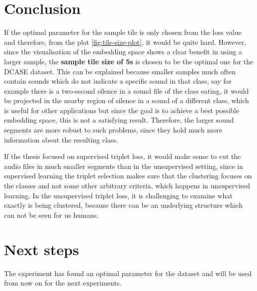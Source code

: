 \documentclass[twocolumn]{article}
\begin{document}
\section{Conclusion}
If the optimal parameter for the sample tile is only chosen from the loss value and therefore, from the plot \ref{fig:tile-size-plot}, it would be quite hard. However, since the visualisation of the embedding space shows a clear benefit in using a larger sample, the \textbf{sample tile size of 5s} is chosen to be the optimal one for the DCASE dataset. This can be explained because smaller samples much often contain sounds which do not indicate a specific sound in that class, say for example there is a two-second silence in a sound file of the class eating, it would be projected in the nearby region of silence in a sound of a different class, which is useful for other applications but since the goal is to achieve a best possible embedding space, this is not a satisfying result. Therefore, the larger sound segments are more robust to such problems, since they hold much more information about the resulting class. 

If the thesis focused on supervised triplet loss, it would make sense to cut the audio files in much smaller segments than in the unsupervised setting, since in supervised learning the triplet selection makes sure that the clustering focuses on the classes and not some other arbitrary criteria, which happens in unsupervised learning. In the unsupervised triplet loss, it is challenging to examine what exactly is being clustered, because there can be an underlying structure which can not be seen for us humans.

\section{Next steps}
The experiment has found an optimal parameter for the dataset and will be used from now on for the next experiments.
\end{document}
